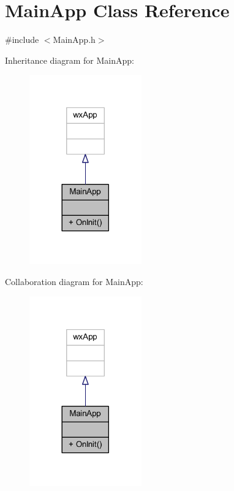 \hypertarget{class_main_app}{}\section{Main\+App Class Reference}
\label{class_main_app}


{\ttfamily \#include $<$Main\+App.\+h$>$}



Inheritance diagram for Main\+App\+:\nopagebreak
\begin{figure}[H]
\begin{center}
\leavevmode
\includegraphics[width=137pt]{class_main_app__inherit__graph}
\end{center}
\end{figure}


Collaboration diagram for Main\+App\+:\nopagebreak
\begin{figure}[H]
\begin{center}
\leavevmode
\includegraphics[width=137pt]{class_main_app__coll__graph}
\end{center}
\end{figure}
